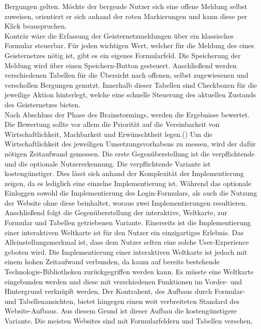 \documentclass[11pt]{article}
\begin{document}
    Bergungen gelten. Möchte der bergende Nutzer sich eine offene Meldung selbst zuweisen, orientiert er sich anhand der roten Markierungen und kann diese per Klick beanspruchen. 
    \\
    Konträr wäre die Erfassung der Geisternetzmeldungen über ein klassisches Formular steuerbar. Für jeden wichtigen
    Wert, welcher für die Meldung des eines Geisternetzes nötig ist, gibt es ein eigenes Formularfeld. Die Speicherung
    der Meldung wird über einen Speichern-Button gesteuert. Anschließend werden verschiedenen Tabellen für
    die Übersicht nach offenen, selbst zugewiesenen und verschollen Bergungen genutzt. Innerhalb dieser Tabellen sind
    Checkboxen für die jeweilige Aktion hinterlegt, welche eine schnelle Steuerung des aktuellen Zustands des Geisternetzes
    bieten. 
    \\
    Nach Abschluss der Phase des Brainstormings, werden die Ergebnisse bewertet. Die Bewertung sollte vor allem die Priorität auf 
    die Vereinbarkeit von Wirtschaftlichkeit, Machbarkeit und Erwünschtheit legen.(\cite{design_thinking})
    Um die Wirtschaftlichkeit des jeweiligen Umsetzungsvorhabens zu messen, wird der dafür nötigen Zeitaufwand gemessen.
    Die erste Gegenüberstellung ist die verpflichtende und die optionale Nutzererkennung.
    Die verpflichtende Variante ist kostengünstiger. Dies lässt sich anhand der Komplexität der Implementierung
    zeigen, da es lediglich eine einzelne Implementierung ist. Während das
    optionale Einloggen sowohl die Implementierung des Login-Formulars, als auch die Nutzung der Website
    ohne diese beinhaltet, woraus zwei Implementierungen resultieren.
    \\
    Anschließend folgt die Gegenüberstellung der interaktive, Weltkarte, zur Formular und Tabellen getriebenen Variante.
    Einerseits ist die Implementierung einer interaktiven Weltkarte ist für den Nutzer ein einzigartiges Erlebnis. 
    Das Alleinstellungsmerkmal ist, dass dem Nutzer selten eine solche User-Experience geboten wird. Die Implementierung einer interaktiven Weltkarte
    ist jedoch mit einem hohen Zeitaufwand verbunden, da kaum auf bereits bestehende Technologie-Bibliotheken zurückgegriffen werden kann. Es müsste eine Weltkarte eingebunden werden und diese mit verschiedenen Funktionen
    im Vorder- und Hintergrund verknüpft werden.
    Der Kontrahent, des Aufbaus durch Formular- und Tabellenansichten, bietet hingegen einen weit verbreiteten Standard des Website-Aufbaus. Aus diesem Grund
    ist dieser Aufbau die kostengünstigere Variante. Die meisten Websites sind mit Formularfeldern und Tabellen versehen, 
\end{document}
